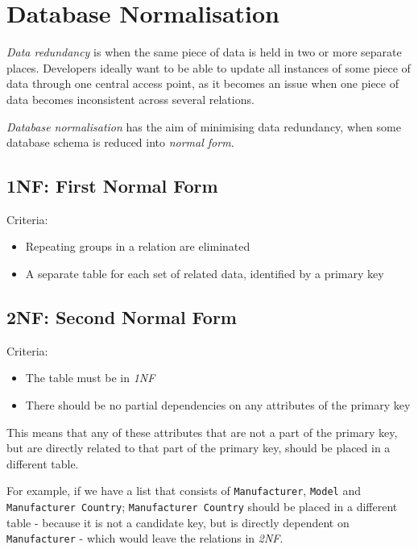 \documentclass{article}
\begin{document}
\section{Database Normalisation}

\textit{Data redundancy} is when the same piece of data is held in two or more separate places. Developers ideally want to be able to update all instances of some piece of data through one central access point, as it becomes an issue when one piece of data becomes inconsistent across several relations.

\textit{Database normalisation} has the aim of minimising data redundancy, when some database schema is reduced into \textit{normal form}.

\subsection{1NF: First Normal Form}

Criteria:

\begin{itemize}
  \item Repeating groups in a relation are eliminated
  \item A separate table for each set of related data, identified by a primary key
\end{itemize}

\subsection{2NF: Second Normal Form}

Criteria:

\begin{itemize}
  \item
        The table must be in \textit{1NF}
  \item
        There should be no partial dependencies on any attributes of the primary key
\end{itemize}

This means that any of these attributes that are not a part of the primary key, but are directly related to that part of the primary key, should be placed in a different table.

For example, if we have a list that consists of \texttt{Manufacturer}, \texttt{Model} and \texttt{Manufacturer Country}; \texttt{Manufacturer Country} should be placed in a different table - because it is not a candidate key, but is directly dependent on \texttt{Manufacturer} - which would leave the relations in \textit{2NF}.
\end{document}
